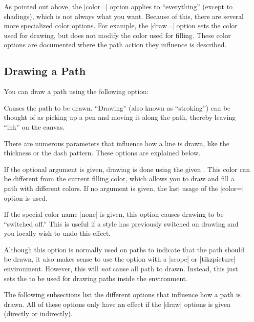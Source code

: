 As pointed out above, the |color=| option applies to ``everything''
(except to shadings), which is not always what you want. Because of
this, there are several more specialized color options. For example,
the |draw=| option sets the color used for drawing, but does not
modify the color used for filling. These color options are documented
where the path action they influence is described.


\subsection{Drawing a Path}

You can draw a path using the following option:
\begin{itemize}
  Causes the path to be drawn. ``Drawing'' (also known as
  ``stroking'') can be thought of as picking up a pen and moving it
  along the path, thereby leaving ``ink'' on the canvas.

  There are numerous parameters that influence how a line is drawn,
  like the thickness or the dash pattern. These options are explained
  below.

  If the optional  argument is given, drawing is done
  using the given . This color can be different from the
  current filling color, which allows you to draw and fill a path with
  different colors. If no  argument is given, the last
  usage of the |color=| option is used.

  If the special color name |none| is given, this option causes
  drawing to be ``switched off.'' This is useful if a style has
  previously switched on drawing and you locally wish to undo this
  effect. 

  Although this option is normally used on paths to indicate that the
  path should be drawn, it also makes sense to use the option with a
  |{scope}| or |{tikzpicture}| environment. However, this will
  \emph{not} cause all path to drawn. Instead, this just sets the
   to be used for drawing paths inside the environment.

\begin{codeexample}[]
\end{codeexample}
\end{itemize}

The following subsections list the different options that influence
how a path is drawn. All of these options only have an effect if the
|draw| options is given (directly or indirectly).

